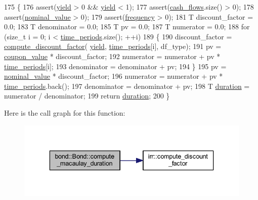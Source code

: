 \begin{DoxyCode}
175     \{
176         assert(\hyperlink{classbond_1_1_bond_ac79ec630d68f58775849145ab305d5f8}{yield} > 0 && \hyperlink{classbond_1_1_bond_ac79ec630d68f58775849145ab305d5f8}{yield} < 1);
177         assert(\hyperlink{classbond_1_1_bond_ae98011d18cd97942b45f5868a42bf668}{cash\_flows}.size() > 0);
178         assert(\hyperlink{classbond_1_1_bond_a7a79ca13c060697765f13140eb471b84}{nominal\_value} > 0);
179         assert(\hyperlink{classbond_1_1_bond_ad1871f40122a63fb0b2ebbdcdd12c1cd}{frequency} > 0);
181         T discount\_factor = 0.0;
183         T denominator = 0.0;
185         T pv = 0.0;
187         T numerator = 0.0;
188         \textcolor{keywordflow}{for} (\textcolor{keywordtype}{size\_t} i = 0; i < \hyperlink{classbond_1_1_bond_ac3db034ebeff1f6cd2ed7061fda27fad}{time\_periods}.size(); ++i)
189         \{
190             discount\_factor = \hyperlink{namespaceirr_ae00c3409ca39fa2dc47ce61da4169a66}{compute\_discount\_factor}(
      \hyperlink{classbond_1_1_bond_ac79ec630d68f58775849145ab305d5f8}{yield}, \hyperlink{classbond_1_1_bond_ac3db034ebeff1f6cd2ed7061fda27fad}{time\_periods}[i], df\_type);
191             pv = \hyperlink{classbond_1_1_bond_aae68bdfac23a0530b3723cca3100e92e}{coupon\_value} * discount\_factor;
192             numerator = numerator + pv * \hyperlink{classbond_1_1_bond_ac3db034ebeff1f6cd2ed7061fda27fad}{time\_periods}[i];
193             denominator = denominator + pv;
194         \}
195         pv = \hyperlink{classbond_1_1_bond_a7a79ca13c060697765f13140eb471b84}{nominal\_value} * discount\_factor;
196         numerator = numerator + pv * \hyperlink{classbond_1_1_bond_ac3db034ebeff1f6cd2ed7061fda27fad}{time\_periods}.back();
197         denominator = denominator + pv;
198         T \hyperlink{classbond_1_1_bond_a76d054bdd6dcdefa0147495f8ecdc852}{duration} = numerator / denominator;
199         \textcolor{keywordflow}{return} \hyperlink{classbond_1_1_bond_a76d054bdd6dcdefa0147495f8ecdc852}{duration};
200     \}
\end{DoxyCode}
Here is the call graph for this function\+:
\nopagebreak
\begin{figure}[H]
\begin{center}
\leavevmode
\includegraphics[width=336pt]{classbond_1_1_bond_a57f98f3e281876089945e08457ce6bc6_cgraph}
\end{center}
\end{figure}
\mbox{\label{classbond_1_1_bond_ab8a8cfc409d2842e8d9053e53d50468f}} 
